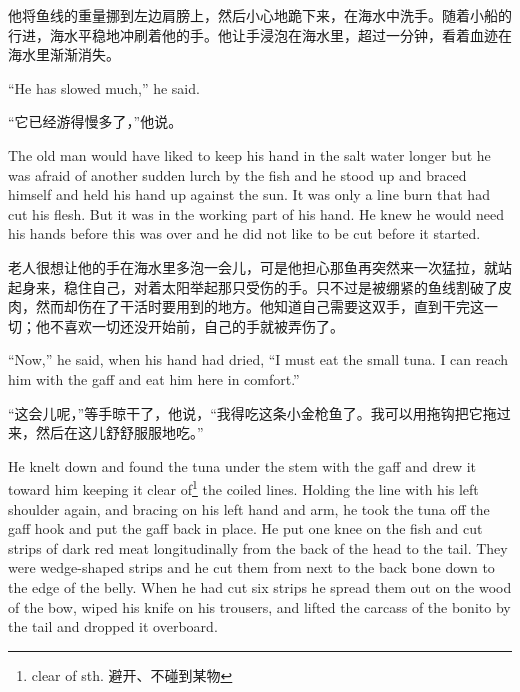 \begin{paracol}{2}
\switchcolumn

他将鱼线的重量挪到左边肩膀上，然后小心地跪下来，在海水中洗手。随着小船的行进，海水平稳地冲刷着他的手。他让手浸泡在海水里，超过一分钟，看着血迹在海水里渐渐消失。

\switchcolumn*

``He has slowed much,'' he said.

\switchcolumn

“它已经游得慢多了，”他说。

\switchcolumn*

The old man would have liked to keep his hand in the salt water longer but
he was afraid of another sudden lurch by the fish and he stood up and braced
himself and held his hand up against the sun. It was only a line burn that
had cut his flesh. But it was in the working part of his hand. He knew he
would need his hands before this was over and he did not like to be cut
before it started.

\switchcolumn

老人很想让他的手在海水里多泡一会儿，可是他担心那鱼再突然来一次猛拉，就站起身来，稳住自己，对着太阳举起那只受伤的手。只不过是被绷紧的鱼线割破了皮肉，然而却伤在了干活时要用到的地方。他知道自己需要这双手，直到干完这一切；他不喜欢一切还没开始前，自己的手就被弄伤了。

\switchcolumn*

``Now,'' he said, when his hand had dried, ``I must eat the small tuna. I
can reach him with the gaff and eat him here in comfort.''

\switchcolumn

“这会儿呢，”等手晾干了，他说，“我得吃这条小金枪鱼了。我可以用拖钩把它拖过来，然后在这儿舒舒服服地吃。”

\switchcolumn*

He knelt down and found the tuna under the stem with the gaff and drew it
toward him keeping it clear of\footnote{clear of sth. 避开、不碰到某物} the
coiled lines. Holding the line with his left shoulder again, and bracing on
his left hand and arm, he took the tuna off the gaff hook and put the gaff
back in place. He put one knee on the fish and cut strips of dark red meat
\gls{longitudinally} from the back of the head to the tail. They were
\gls{wedge-shaped} strips and he cut them from next to the back bone down to the
edge of the belly. When he had cut six strips he spread them out on the wood
of the bow, \gls{wiped} his knife on his trousers, and lifted the \gls{carcass} of the
bonito by the tail and dropped it overboard.


\end{paracol}
